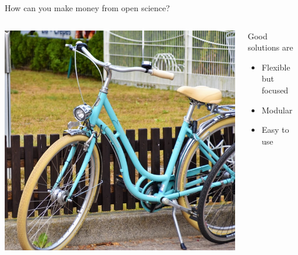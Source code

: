 \begin{frame}{How can you make money from open science?}

\begin{columns}[c]

    \begin{column}{0.45\textwidth}
        \includegraphics[width=\textwidth]{images/waldemar-brandt-FiK8jopQh8-unsplash.jpg}
        \pause
    \end{column}
    
    \begin{column}{0.45\textwidth}
        Good solutions are
        \begin{itemize}
            \item Flexible but focused
            \item Modular
            \item Easy to use
        \end{itemize}
    \end{column}
    
\end{columns}

\end{frame}
